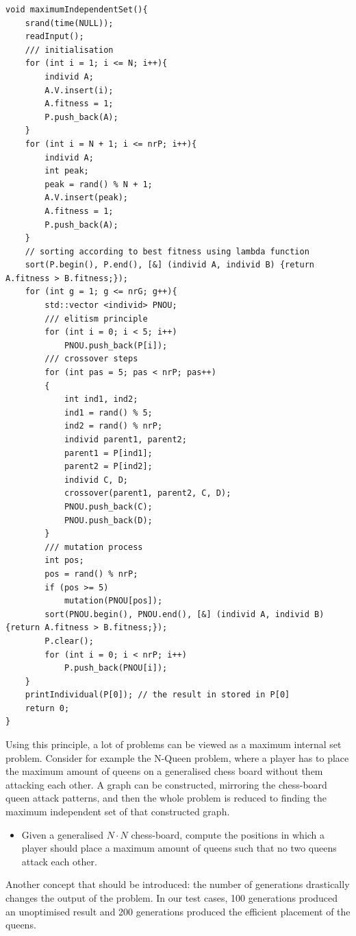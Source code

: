 \documentclass[letterpaper]{article}
\begin{document}
\begin{lstlisting}
void maximumIndependentSet(){
    srand(time(NULL));
    readInput();
    /// initialisation 
    for (int i = 1; i <= N; i++){
        individ A;
        A.V.insert(i);
        A.fitness = 1;
        P.push_back(A);
    }
    for (int i = N + 1; i <= nrP; i++){
        individ A;
        int peak;
        peak = rand() % N + 1;
        A.V.insert(peak);
        A.fitness = 1;
        P.push_back(A);
    }
    // sorting according to best fitness using lambda function
    sort(P.begin(), P.end(), [&] (individ A, individ B) {return A.fitness > B.fitness;}); 
    for (int g = 1; g <= nrG; g++){
        std::vector <individ> PNOU;
        /// elitism principle
        for (int i = 0; i < 5; i++)
            PNOU.push_back(P[i]);
        /// crossover steps
        for (int pas = 5; pas < nrP; pas++)
        {
            int ind1, ind2;
            ind1 = rand() % 5;
            ind2 = rand() % nrP;
            individ parent1, parent2;
            parent1 = P[ind1];
            parent2 = P[ind2];
            individ C, D;
            crossover(parent1, parent2, C, D);
            PNOU.push_back(C);
            PNOU.push_back(D);
        }
        /// mutation process
        int pos;
        pos = rand() % nrP;
        if (pos >= 5)
            mutation(PNOU[pos]);
        sort(PNOU.begin(), PNOU.end(), [&] (individ A, individ B) {return A.fitness > B.fitness;});
        P.clear();
        for (int i = 0; i < nrP; i++)
            P.push_back(PNOU[i]);
    }
    printIndividual(P[0]); // the result in stored in P[0]
    return 0;
}
\end{lstlisting}

Using this principle, a lot of problems can be viewed as a maximum internal set problem. Consider for example the N-Queen problem, where a player has to place the maximum amount of queens on a generalised chess board without them attacking each other. A graph can be constructed, mirroring the chess-board queen attack patterns, and then the whole problem is reduced to finding the maximum independent set of that constructed graph. 

\begin{itemize}
    \item Given a generalised $N \cdot N$ chess-board, compute the positions in which a player should place a maximum amount of queens such that no two queens attack each other.
\end{itemize}

Another concept that should be introduced: the number of generations drastically changes the output of the problem. In our test cases, 100 generations produced an unoptimised result and 200 generations produced the efficient placement of the queens.
\end{document}
